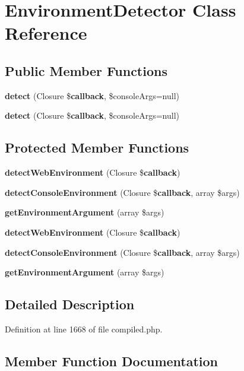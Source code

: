 \section{Environment\+Detector Class Reference}
\label{class_illuminate_1_1_foundation_1_1_environment_detector}
\subsection*{Public Member Functions}
\begin{DoxyCompactItemize}
\item 
{\bf detect} (Closure \${\bf callback}, \$console\+Args=null)
\item 
{\bf detect} (Closure \${\bf callback}, \$console\+Args=null)
\end{DoxyCompactItemize}
\subsection*{Protected Member Functions}
\begin{DoxyCompactItemize}
\item 
{\bf detect\+Web\+Environment} (Closure \${\bf callback})
\item 
{\bf detect\+Console\+Environment} (Closure \${\bf callback}, array \$args)
\item 
{\bf get\+Environment\+Argument} (array \$args)
\item 
{\bf detect\+Web\+Environment} (Closure \${\bf callback})
\item 
{\bf detect\+Console\+Environment} (Closure \${\bf callback}, array \$args)
\item 
{\bf get\+Environment\+Argument} (array \$args)
\end{DoxyCompactItemize}


\subsection{Detailed Description}


Definition at line 1668 of file compiled.\+php.



\subsection{Member Function Documentation}
